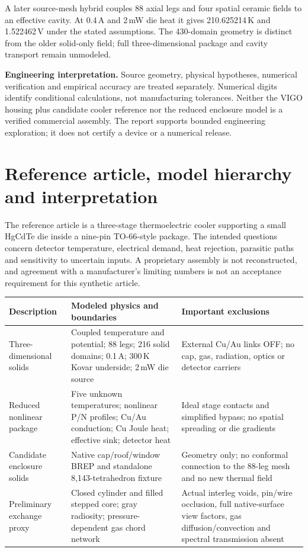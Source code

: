 \documentclass[11pt,a4paper]{article}
\begin{document}
A later source-mesh hybrid couples 88 axial legs and four spatial ceramic fields to an effective cavity. At 0.4\,A and 2\,mW die heat it gives 210.625214\,K and 1.522462\,V under the stated assumptions. The 430-domain geometry is distinct from the older solid-only field; full three-dimensional package and cavity transport remain unmodeled.

\textbf{Engineering interpretation.} Source geometry, physical hypotheses, numerical verification and empirical accuracy are treated separately. Numerical digits identify conditional calculations, not manufacturing tolerances. Neither the VIGO housing plus candidate cooler reference nor the reduced enclosure model is a verified commercial assembly. The report supports bounded engineering exploration; it does not certify a device or a numerical release.
\clearpage
\tableofcontents
\clearpage
\section{Reference article, model hierarchy and interpretation}
The reference article is a three-stage thermoelectric cooler supporting a small HgCdTe die inside a nine-pin TO-66-style package. The intended questions concern detector temperature, electrical demand, heat rejection, parasitic paths and sensitivity to uncertain inputs. A proprietary assembly is not reconstructed, and agreement with a manufacturer's limiting numbers is not an acceptance requirement for this synthetic article.

\begin{tabularx}{\linewidth}{p{29mm}XX}\toprule
Description & Modeled physics and boundaries & Important exclusions\\\midrule
Three-dimensional solids & Coupled temperature and potential; 88 legs; 216 solid domains; 0.1\,A; 300\,K Kovar underside; 2\,mW die source & External Cu/Au links OFF; no cap, gas, radiation, optics or detector carriers\\
Reduced nonlinear package & Five unknown temperatures; nonlinear P/N profiles; Cu/Au conduction; Cu Joule heat; effective sink; detector heat & Ideal stage contacts and simplified bypass; no spatial spreading or die gradients\\
Candidate enclosure solids & Native cap/roof/window BREP and standalone 8,143-tetrahedron fixture & Geometry only; no conformal connection to the 88-leg mesh and no new thermal field\\
Preliminary exchange proxy & Closed cylinder and filled stepped core; gray radiosity; pressure-dependent gas chord network & Actual interleg voids, pin/wire occlusion, full native-surface view factors, gas diffusion/convection and spectral transmission absent\\\bottomrule
\end{tabularx}
\end{document}
